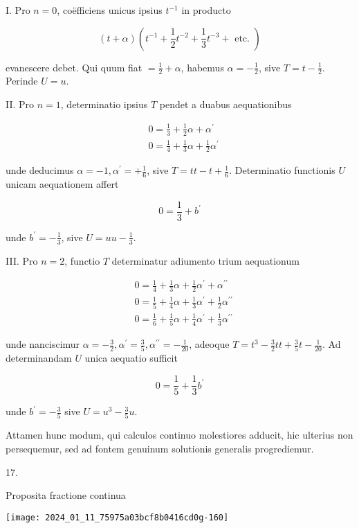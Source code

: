 \documentclass[10pt]{article}
\begin{document}
I. Pro \(n=0\), coëfficiens unicus ipsius \(t^{-1}\) in producto

\[
(t+\alpha)\left(t^{-1}+\frac{1}{2} t^{-2}+\frac{1}{3} t^{-3}+\text { etc. }\right)
\]

evanescere debet. Qui quum fiat \(=\frac{1}{2}+\alpha\), habemus \(\alpha=-\frac{1}{2}\), sive \(T=t-\frac{1}{2}\). Perinde \(U=u\).

II. Pro \(n=1\), determinatio ipsius \(T\) pendet a duabus aequationibus

\[
\begin{aligned}
& 0=\frac{1}{3}+\frac{1}{2} \alpha+\alpha^{\prime} \\
& 0=\frac{1}{4}+\frac{1}{3} \alpha+\frac{1}{2} \alpha^{\prime}
\end{aligned}
\]

unde deducimus \(\alpha=-1, \alpha^{\prime}=+\frac{1}{6}\), sive \(T=t t-t+\frac{1}{6}\). Determinatio functionis \(U\) unicam aequationem affert

\[
0=\frac{1}{3}+b^{\prime}
\]

unde \(b^{\prime}=-\frac{1}{3}\), sive \(U=u u-\frac{1}{3}\).

III. Pro \(n=2\), functio \(T\) determinatur adiumento trium aequationum

\[
\begin{aligned}
& 0=\frac{1}{4}+\frac{1}{3} \alpha+\frac{1}{2} \alpha^{\prime}+\alpha^{\prime \prime} \\
& 0=\frac{1}{5}+\frac{1}{4} \alpha+\frac{1}{3} \alpha^{\prime}+\frac{1}{2} \alpha^{\prime \prime} \\
& 0=\frac{1}{6}+\frac{1}{5} \alpha+\frac{1}{4} \alpha^{\prime}+\frac{1}{3} \alpha^{\prime \prime}
\end{aligned}
\]

unde nanciscimur \(\alpha=-\frac{3}{2}, \alpha^{\prime}=\frac{3}{5}, \alpha^{\prime \prime}=-\frac{1}{20}\), adeoque \(T=t^{3}-\frac{3}{2} t t+\frac{3}{5} t-\frac{1}{20}\). Ad determinandam \(U\) unica aequatio sufficit

\[
0=\frac{1}{5}+\frac{1}{3} b^{\prime}
\]

unde \(b^{\prime}=-\frac{3}{5}\) sive \(U=u^{3}-\frac{3}{5} u\).

Attamen hunc modum, qui calculos continuo molestiores adducit, hic ulterius non persequemur, sed ad fontem genuinum solutionis generalis progrediemur.

17.

Proposita fractione continua

\begin{center}
\texttt{[image: 2024\_01\_11\_75975a03bcf8b0416cd0g-160]}
\end{center}
\end{document}
